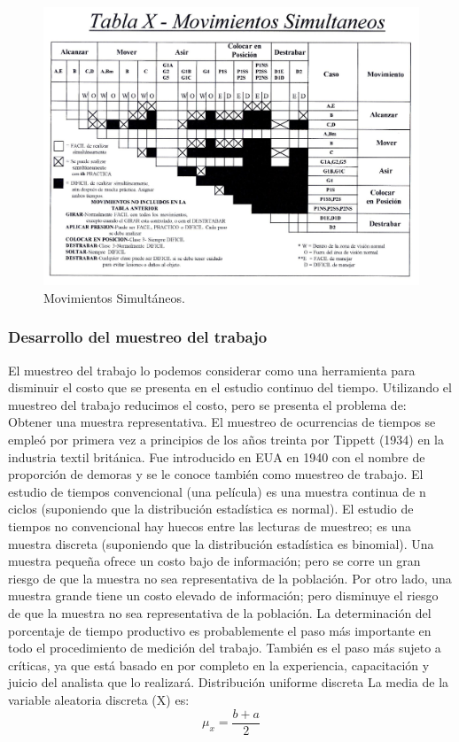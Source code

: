     \begin{figure}[H]
        \centering
        \includegraphics[scale=0.35]{3/Img/tabla10MovimientosSimultaneos.pdf}
        \caption{Movimientos Simultáneos.}
        \label{fig:tabla10MovimientosSimultaneos}
    \end{figure}
    \cite{STP}
    \subsubsection{Desarrollo del muestreo del trabajo}
    
    El muestreo del trabajo lo podemos considerar como una herramienta para disminuir el costo que se presenta en el estudio continuo del tiempo.
    Utilizando el muestreo del trabajo reducimos el costo, pero se presenta el problema de: Obtener una muestra representativa.
    El muestreo de ocurrencias de tiempos se empleó por primera vez a principios de los años treinta por Tippett (1934) en la industria textil británica. Fue introducido en EUA en 1940 con el nombre de proporción de demoras y se le conoce también como muestreo de trabajo.
    El estudio de tiempos convencional (una película) es una muestra continua de n ciclos (suponiendo que la distribución estadística es normal). El estudio de tiempos no convencional hay huecos entre las lecturas de muestreo; es una muestra discreta (suponiendo que la distribución estadística es binomial).
    Una muestra pequeña ofrece un costo bajo de información; pero se corre un gran riesgo de que la muestra no sea representativa de la población.
    Por otro lado, una muestra grande tiene un costo elevado de información; pero disminuye el riesgo de que la muestra no sea representativa de la población.
    La determinación del porcentaje de tiempo productivo es probablemente el paso más importante en todo el procedimiento de medición del trabajo. También es el paso más sujeto a críticas, ya que está basado en por completo en la experiencia, capacitación y juicio del analista que lo realizará. \cite{Muestreodetrabajo}
    Distribución uniforme discreta
     La media de la variable aleatoria discreta (X) es:
        \begin{equation}
             \mu_x=\dfrac{b+a}{2}
        \end{equation}
        
